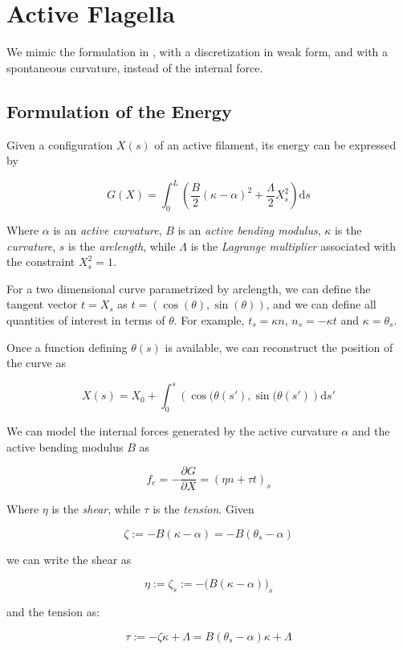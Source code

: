 \documentclass[12pt]{article}
\renewcommand{\d}{\mathrm{d}}
\newcommand{\cB}{B}
\begin{document}
\section{Active Flagella}\label{active-flagella}

We mimic the formulation in \cite{CamaletJulicher2000}, with a
discretization in weak form, and with a spontaneous curvature, instead
of the internal force.

\subsection{Formulation of the Energy}

Given a configuration \(X(s)\) of an active filament, its energy can be expressed by

\[G(X) = \int_0^L \left( \frac{\cB}{2}(\kappa-\alpha)^2 +
  \frac{\Lambda}{2} X_s^2 \right) \d s\]

Where $\alpha$ is an \emph{active curvature}, $\cB$ is an \emph{active
  bending modulus}, $\kappa$ is the \emph{curvature}, $s$ is the
\emph{arclength}, while $\Lambda$ is the \emph{Lagrange multiplier}
associated with the constraint $X_s^2 = 1$.

For a two dimensional curve parametrized by arclength, we can define
the tangent vector $t = X_s$ as $t = (\cos(\theta), \sin(\theta))$, and
we can define all quantities of interest in terms of $\theta$. For
example, $t_s = \kappa n$, $n_s = -\kappa t$ and $\kappa = \theta_s$.

Once a function defining \(\theta(s)\) is available, we can reconstruct
the position of the curve as

\[X(s) = X_0 + \int_0^s \left(\cos(\theta(s'), \sin(\theta(s') \right)
\d s'\]

We can model the internal forces generated by the active curvature
$\alpha$ and the active bending modulus $\cB$ as

\[f_e = -\frac{\partial G}{\partial X} = (\eta n + \tau t)_s\]

Where \(\eta\) is the \emph{shear}, while $\tau$ is the
\emph{tension}. Given 

\[\zeta := -\cB(\kappa - \alpha) = -\cB(\theta_s - \alpha)\]

we can write the shear as

\[\eta := \zeta_s := -\big( \cB(\kappa - \alpha) \big)_s\]

and the tension as:

\[\tau := -\zeta\kappa + \Lambda = \cB(\theta_s-\alpha)\kappa +\Lambda\]
\end{document}
